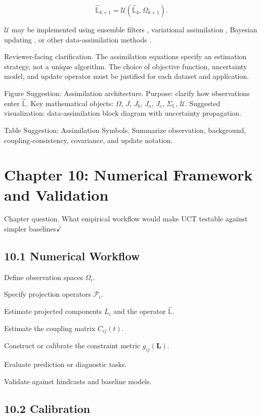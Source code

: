\documentclass[aps,pre,reprint,superscriptaddress,nofootinbib]{revtex4-2}
\begin{document}
\[ \hat{\mathbb{L}}_{k+1}=\mathcal{U}(\hat{\mathbb{L}}_k,\Omega_{k+1}). \]

\(\mathcal{U}\) may be implemented using ensemble filters \cite{Kalnay2003Assimilation}, variational assimilation \cite{Kalnay2003Assimilation}, Bayesian updating \cite{Jaynes1957I}, or other data-assimilation methods \cite{Kalnay2003Assimilation}.

Reviewer-facing clarification. The assimilation equations specify an estimation strategy, not a unique algorithm. The choice of objective function, uncertainty model, and update operator must be justified for each dataset and application.

Figure Suggestion: Assimilation architecture. Purpose: clarify how observations enter \(\hat{\mathbb{L}}\). Key mathematical objects: \(\Omega\), \(J\), \(J_b\), \(J_o\), \(J_c\), \(\Sigma_{\mathbb{L}}\), \(\mathcal{U}\). Suggested visualization: data-assimilation block diagram with uncertainty propagation.

Table Suggestion: Assimilation Symbols. Summarize observation, background, coupling-consistency, covariance, and update notation.

\section{Chapter 10: Numerical Framework and Validation}

Chapter question. What empirical workflow would make UCT testable against simpler baselines$\checkmark$

\subsection{10.1 Numerical Workflow}

Define observation spaces \(\Omega_i\).

Specify projection operators \(\mathcal{P}_i\).

Estimate projected components \(L_i\) and the operator \(\hat{\mathbb{L}}\).

Estimate the coupling matrix \(C_{ij}(t)\).

Construct or calibrate the constraint metric \(g_{ij}(\mathbf{L})\).

Evaluate prediction or diagnostic tasks.

Validate against hindcasts and baseline models.

\subsection{10.2 Calibration}
\end{document}
